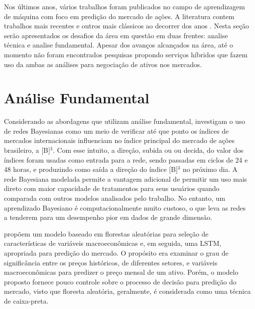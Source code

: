 \label{SEC:RWORK}

Nos últimos anos, vários trabalhos foram publicados no campo de aprendizagem de máquina com foco em predição do mercado de ações. A literatura contem trabalhos mais recentes \cite{fusionportifolio, ga_optimized_lstm, random_forest_macroeconomic, review, airms, forecasting_bayesian, clustering_svm} e outros mais clássicos ao decorrer dos anos \cite{google_trends, cesarone2011portfolio, predicting_direction_svm,  hybrid_forecasting, gabased_svm, forecasting_returns, nn_forecasting}. Nesta seção serão apresentados os desafios da área em questão em duas frentes: analise técnica e analise fundamental. Apesar dos avanços alcançados na área, até o momento não foram encontrados pesquisas propondo serviços híbridos que fazem uso da ambas as análises para negociação de ativos nos mercados.

\section{Análise Fundamental}

Considerando as abordagens que utilizam análise fundamental, \textcite{forecasting_bayesian} investigam o uso de redes Bayesianas como um meio de verificar até que ponto os índices de mercados internacionais influenciam no índice principal do mercado de ações brasileiro, a [B]$^3$. Com esse intuito, a direção, subida ou ou decida, do valor dos índices foram usadas como entrada para a rede, sendo passadas em ciclos de 24 e 48 horas, e produzindo como saída a direção do índice [B]$^3$ no próximo dia. A rede Bayesiana modelada permite a vantagem adicional de permitir um uso mais direto com maior capacidade de tratamentos para seus usuários quando comparada com outros modelos analisados pelo trabalho. No entanto, um aprendizado Bayesiano é computacionalmente muito custoso, o que leva as redes a tenderem para um desempenho pior em dados de grande dimensão.

\textcite{random_forest_macroeconomic} propõem um modelo baseado em florestas aleatórias para seleção de características de variáveis macroeconômicas e, em seguida, uma LSTM, apropriada para predição do mercado. O propósito era examinar o grau de significância entre os preços históricos, de diferentes setores, e variáveis macroeconômicas para predizer o preço mensal de um ativo. Porém, o modelo proposto fornece pouco controle sobre o processo de decisão para predição do mercado, visto que floresta aleatória, geralmente, é considerada como uma técnica de caixa-preta.

